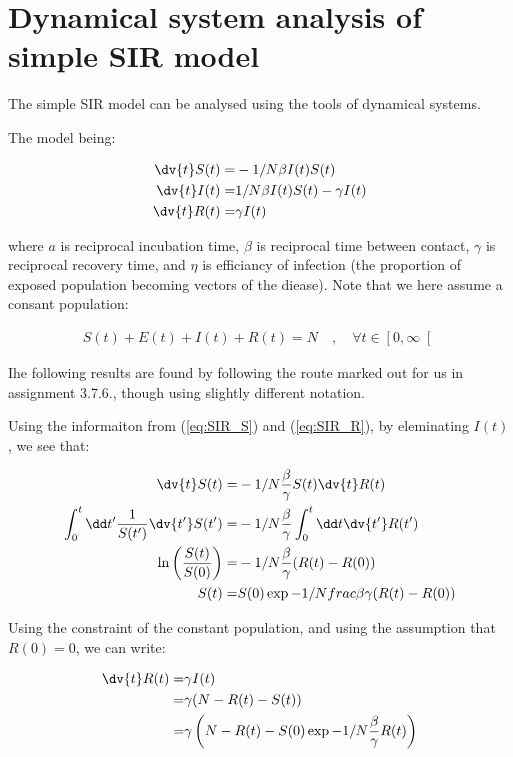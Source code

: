 \section{Dynamical system analysis of simple SIR model} 

The simple SIR model can be analysed using the tools of dynamical systems.

The model being:

\begin{align}
\dv{t}S(t) =& - 1/N \beta I(t) S(t) \label{eq:SIR_S}\\
\dv{t}I(t) =& 1/N \beta I(t)S(t) - \gamma I(t) \label{eq:SIR_I}\\
\dv{t}R(t) =& \gamma I(t) \label{eq:SIR_R}
\end{align}

 where $a$ is reciprocal incubation time,
$\beta$ is reciprocal time between contact,
$\gamma$ is reciprocal recovery time,
and $\eta$ is efficiancy of infection (the proportion of exposed population becoming vectors
 of the diease).
Note that we here assume a consant population:

\begin{align*}
S(t) + E(t) + I(t) + R(t) = N \quad , \quad \forall t \in \left[ 0, \infty \right[ %
\end{align*}

Ihe following results are found by following the route marked out for us in \cite{strogats_1994} assignment 3.7.6., though using slightly different notation.

Using the informaiton from (\ref{eq:SIR_S}) and (\ref{eq:SIR_R}), by eleminating $I(t)$, we see that:

\begin{align}
\dv{t}S(t) =& - 1/N \frac{\beta}{\gamma} S(t) \dv{t}R(t) \nonumber \\
\int_{0}^{t}\dd t' \frac{1}{S(t')} \dv{t'} S(t') =& - 1/N \frac{\beta}{\gamma} \int_{0}^{t} \dd t \dv{t'}R(t') \nonumber \\
\ln \left( \frac{S(t)}{S(0)} \right) =& - 1/N \frac{\beta}{\gamma} (R(t) - R(0)) \nonumber \\
S(t) =& S(0) \exp { - 1/N frac{\beta}{\gamma} (R(t) - R(0)) } \label{eq:SR} 
\end{align}

Using the constraint of the constant population, and using the assumption that $R(0) = 0$, we can write:

\begin{align*}
\dv{t} R(t) =& \gamma I(t)\\
=& \gamma (N - R(t) - S(t))\\
=& \gamma \left(N - R(t) - S(0) \exp { - 1/N \frac{\beta}{\gamma} R(t) } \right)
\end{align*}

